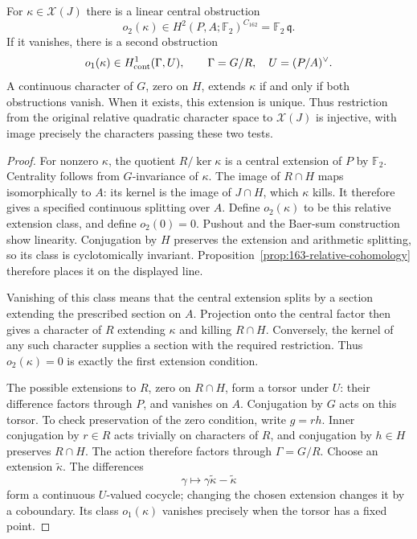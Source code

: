 \begin{proposition}
\label{prop:163-two-stage-extension}
For \(\kappa\in\mathscr X(J)\) there is a linear central
obstruction
\[
 o_2(\kappa)\in H^2(P,A;\mathbb F_2)^{C_{162}}
                       =\mathbb F_2\,\mathfrak q.
\]
If it vanishes, there is a second obstruction
\[
 o_1(\kappa)\in H^1_{\rm cont}(\Gamma,U),
 \qquad\Gamma=G/R,\quad U=(P/A)^\vee.
\]
A continuous character of \(G\), zero on \(H\), extends
\(\kappa\) if and only if both obstructions vanish.
When it exists, this extension is unique.
Thus restriction from the original relative quadratic
character space to \(\mathscr X(J)\) is injective,
with image precisely the characters passing these two tests.
\end{proposition}
\begin{proof}
For nonzero \(\kappa\), the quotient \(R/\ker\kappa\)
is a central extension of \(P\) by \(\mathbb F_2\).
Centrality follows from \(G\)-invariance of \(\kappa\).
The image of \(R\cap H\) maps isomorphically to \(A\):
its kernel is the image of \(J\cap H\), which
\(\kappa\) kills. It therefore gives a specified
continuous splitting over \(A\).
Define \(o_2(\kappa)\) to be this relative extension
class, and define \(o_2(0)=0\).
Pushout and the Baer-sum construction show linearity.
Conjugation by \(H\) preserves the extension and
arithmetic splitting, so its class is cyclotomically
invariant. Proposition~\ref{prop:163-relative-cohomology}
therefore places it on the displayed line.

Vanishing of this class means that the central
extension splits by a section extending the prescribed
section on \(A\). Projection onto the central factor
then gives a character of \(R\) extending \(\kappa\)
and killing \(R\cap H\). Conversely, the kernel of
any such character supplies a section with the required
restriction. Thus \(o_2(\kappa)=0\) is exactly the
first extension condition.

The possible extensions to \(R\), zero on \(R\cap H\),
form a torsor under \(U\): their difference factors
through \(P\), and vanishes on \(A\).
Conjugation by \(G\) acts on this torsor.
To check preservation of the zero condition, write
\(g=rh\). Inner conjugation by \(r\in R\) acts trivially
on characters of \(R\), and conjugation by \(h\in H\)
preserves \(R\cap H\). The action therefore factors
through \(\Gamma=G/R\).
Choose an extension \(\widetilde\kappa\). The differences
\[
 \gamma\longmapsto
       \gamma\widetilde\kappa-\widetilde\kappa
\]
form a continuous \(U\)-valued cocycle; changing the
chosen extension changes it by a coboundary.
Its class \(o_1(\kappa)\) vanishes precisely when
the torsor has a fixed point.


\end{proof}
